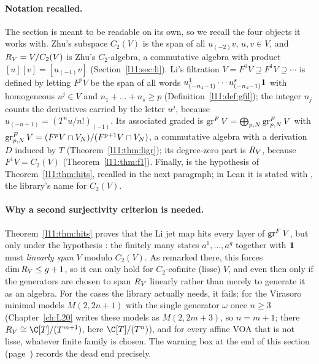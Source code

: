 \paragraph{Notation recalled.} The section is meant to be readable on its own, so we recall the four objects it
works with. Zhu's subspace $C_2(V)$ is the span of all $u_{(-2)}v$, $u,v\in V$, and $R_V = V/C_2(V)$ is
Zhu's $C_2$-algebra, a commutative algebra with product $[u][v] = [u_{(-1)}v]$
(Section~\ref{l11:sec:li}). Li's filtration $V = F^0V\supseteq F^1V\supseteq\cdots$ is defined by letting $F^pV$ be
the span of all words $u^1_{(-n_1-1)}\cdots u^s_{(-n_s-1)}\mathbf{1}$ with homogeneous $u^j\in V$ and $n_1+\dots+n_s\ge p$
(Definition~\ref{l11:def:gfil}); the integer $n_j$ counts the derivatives carried by the letter $u^j$, because
$u_{(-n-1)} = (T^nu/n!)_{(-1)}$. Its associated graded is $\operatorname{gr}^FV = \bigoplus_{p,N}\operatorname{gr}^F_{p,N}V$ with
$\operatorname{gr}^F_{p,N}V = (F^pV\cap V_N)/(F^{p+1}V\cap V_N)$, a commutative algebra with a derivation $D$ induced by $T$
(Theorem~\ref{l11:thm:ligr}); its degree-zero part is $R_V$, because $F^1V = C_2(V)$ (Theorem~\ref{l11:thm:f1}).
Finally,  is the hypothesis of Theorem~\ref{l11:thm:hits}, recalled in the next paragraph; in Lean it is
stated with , the library's name for $C_2(V)$.

\paragraph{Why a second surjectivity criterion is needed.} Theorem~\ref{l11:thm:hits} proves that the Li jet
map hits every layer of $\operatorname{gr}^FV$, but only under the hypothesis : the finitely many states
$a^1,\dots,a^g$ together with $\mathbf{1}$ must \emph{linearly span} $V$ modulo $C_2(V)$. As remarked there,
this forces $\dim R_V\le g+1$, so it can only hold for $C_2$-cofinite (lisse) $V$, and even then only
if the generators are chosen to span $R_V$ linearly rather than merely to generate it as an algebra.
For the cases the library actually needs, it fails: for the Virasoro minimal models $M(2,2n+1)$ with the single
generator $\omega$ once $n\ge3$ (Chapter~\ref{ch:L20} writes these models as $M(2,2m+3)$, so $n=m+1$; there
$\lelevenR\cong\C[T]/(T^{m+1})$, here $\C[T]/(T^n)$), and for every affine VOA that is not lisse, whatever finite family is chosen. The
warning box at the end of this section (page~\pageref{l11:warn:hdec}) records the dead end precisely.


